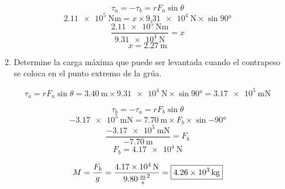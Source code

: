 \documentclass[Física - Práctica.root.tex]{subfiles}
\begin{document}
\begin{enumerate}
\begin{enumerate}
                \[\tau_a=-\tau_b=rF_a\sin{\theta}\]
                \[\SI{2,11e5}{\newton\meter}=x\times\SI{9,31e4}{\newton}\times\sin{\ang{90}}\]
                \[\frac{\SI{2,11e5}{\newton\meter}}{\SI{9,31e4}{\newton}}=x\]
                \[x=\boxed{\SI{2,27}{\meter}}\]

          \item Determine la carga máxima que puede ser levantada cuando el contrapeso se coloca en el punto extremo de la grúa.

                \[
                  \tau_a=rF_a\sin{\theta}
                  =\SI{3,40}{\meter}\times\SI{9,31e4}{\newton}\times\sin{\ang{90}}
                  =\SI{3,17e5}{\meter\newton}
                \]

                \[\tau_b=-\tau_a=rF_b\sin{\theta}\]
                \[\SI{-3,17e5}{\meter\newton}=\SI{7,70}{\meter}\times F_b\times\sin{\ang{-90}}\]
                \[\frac{\SI{-3,17e5}{\meter\newton}}{\SI{-7,70}{\meter}}=F_b\]
                \[F_b=\SI{4,17e4}{\newton}\]

                \[
                  M=\frac{F_b}{g}
                  =\frac{\SI{4,17e4}{\newton}}{\SI{9,80}{\meter\over\second\squared}}
                  =\boxed{\SI{4,26e3}{\kilogram}}
                \]
        \end{enumerate}
\end{enumerate}
\end{document}
